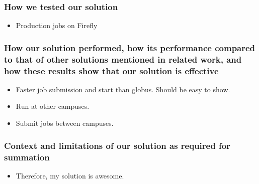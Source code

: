 \documentclass[11pt]{article}
\begin{document}
\subsubsection*{How we tested our solution}
\begin{itemize}

\item Production jobs on Firefly

\end{itemize}


\subsubsection*{How our solution performed, how its performance compared to
that of other solutions mentioned in related work, and how these results show
that our solution is effective}

\begin{itemize}

\item
Faster job submission and start than globus.  Should be easy to show.

\item
Run at other campuses.

\item
Submit jobs between campuses.

\end{itemize}


\subsubsection*{Context and limitations of our solution as required for 
summation}
\begin{itemize}
\item
Therefore, my solution is awesome.

\end{itemize}
\end{document}
